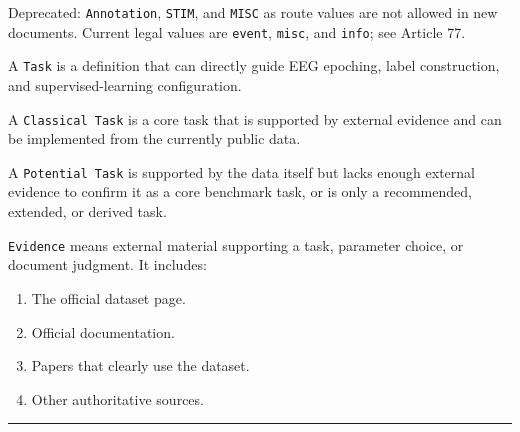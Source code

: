 \begin{tcolorbox}
\noindent Deprecated: \texttt{Annotation}, \texttt{STIM}, and \texttt{MISC} as route values are not allowed in new documents. Current legal values are \texttt{event}, \texttt{misc}, and \texttt{info}; see Article 77.\par\smallskip

\smallskip{}\par\smallskip

\noindent A \texttt{Task} is a definition that can directly guide EEG epoching, label construction, and supervised-learning configuration.\par\smallskip

\smallskip{}\par\smallskip

\noindent A \texttt{Classical Task} is a core task that is supported by external evidence and can be implemented from the currently public data.\par\smallskip

\smallskip{}\par\smallskip

\noindent A \texttt{Potential Task} is supported by the data itself but lacks enough external evidence to confirm it as a core benchmark task, or is only a recommended, extended, or derived task.\par\smallskip

\smallskip{}\par\smallskip

\noindent \texttt{Evidence} means external material supporting a task, parameter choice, or document judgment. It includes:\par\smallskip

\begin{enumerate}[leftmargin=1.5em,noitemsep,topsep=2pt]
\item The official dataset page.
\item Official documentation.
\item Papers that clearly use the dataset.
\item Other authoritative sources.
\end{enumerate}

\medskip{}
\par\nopagebreak\noindent\rule{\linewidth}{0.4pt}\par\smallskip


\end{tcolorbox}
